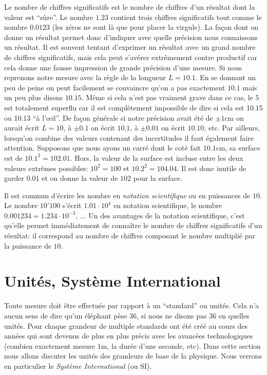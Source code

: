 \documentclass[a4paper,12pt]{book}
\newcommand{\cm}{\mathrm{cm}}
\newcommand{\m}{\mathrm{m}}
\begin{document}
Le nombre de chiffres significatifs est le nombre de chiffres d'un résultat dont la valeur est ``sûre''. Le nombre $1.23$ contient trois chiffres 
significatifs tout comme le nombre $0.0123$ (les zéros ne sont là que pour placer la virgule). La façon dont on donne un résultat
permet donc d'indiquer avec quelle précision nous connaissons un résultat. Il est souvent tentant d'exprimer un résultat avec un grand nombre de chiffres
significatifs, mais cela peut s'avérer extrêmement contre productif car cela donne une fausse impression de grande précision d'une mesure.
Si nous reprenons notre mesure avec la règle de la longueur $L=10.1$. En se donnant un peu de peine on peut facilement se convaincre qu'on a
pas exactement $10.1$ mais un peu plus disons $10.15$. Même si cela n'est pas vraiment grave dans ce cas, le $5$ est totalement superflu
car il est complètement impossible de dire si cela est 10.15 ou 10.13 ``à l’œil''. De façon générale si notre précision avait été de $\pm 1\cm$
on aurait écrit $L=10$, à $\pm 0.1$ on écrit $10.1$, à $\pm 0.01$ on écrit $10.10$, etc. Par ailleurs, lorsqu’on combine des valeurs contenant
des incertitudes il faut également faire attention. Supposons que nous ayons un carré dont le coté fait $10.1\cm$, sa surface est de 
$10.1^2=102.01$. Hors, la valeur de la surface est incluse entre les deux valeurs extrêmes possibles: $10^2=100$ et $10.2^2=104.04$. Il est 
donc inutile de garder $0.01$ et on donne la valeur de $102$ pour la surface.

Il est commun d'écrire les nombre en \textit{notation scientifique} ou en puissances de $10$. Le nombre $10'100$ s'écrit $1.01\cdot 10^4$ en notation
scientifique, le nombre $0.001234=1.234\cdot 10^{-3}$, ... Un des avantages de la notation scientifique, c'est qu'elle permet immédiatement de connaître le nombre de chiffres
significatifs d'un résultat: il correspond au nombre de chiffres composant le nombre multiplié par la puissance de $10$.

\section{Unités, Système International}

Toute mesure doit être effectuée par rapport à un ``standard'' ou unités. Cela n'a aucun sens de dire qu'un éléphant pèse 36, si nous ne disons pas
36 en quelles unités. Pour chaque grandeur de multiple standards ont été créé au cours des années qui sont devenus de plus en plus précis
avec les avancées technologiques (combien exactement mesure $1\m$, la durée d'une seconde, etc). 
Dans cette section nous allons discuter les unités des grandeurs de base  de la physique. Nous verrons en particulier le \textit{Système International} (ou SI).
\end{document}
